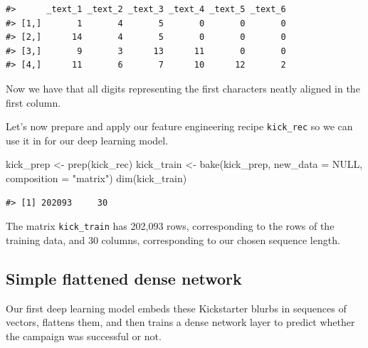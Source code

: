 \documentclass[
]{krantz}
\makeatletter
\newenvironment{Shaded}{\begin{snugshade}}{\end{snugshade}}
\newcommand{\AttributeTok}[1]{\textcolor[rgb]{0.77,0.63,0.00}{#1}}
\newcommand{\ConstantTok}[1]{\textcolor[rgb]{0.00,0.00,0.00}{#1}}
\newcommand{\FunctionTok}[1]{\textcolor[rgb]{0.00,0.00,0.00}{#1}}
\newcommand{\NormalTok}[1]{#1}
\newcommand{\OtherTok}[1]{\textcolor[rgb]{0.56,0.35,0.01}{#1}}
\newcommand{\StringTok}[1]{\textcolor[rgb]{0.31,0.60,0.02}{#1}}
\newenvironment{kframe}{%
\medskip{}
\setlength{\fboxsep}{.8em}
 \def\at@end@of@kframe{}%
 \ifinner\ifhmode%
  \def\at@end@of@kframe{\end{minipage}}%
  \begin{minipage}{\columnwidth}%
 \fi\fi%
 \def\FrameCommand##1{\hskip\@totalleftmargin \hskip-\fboxsep
 \colorbox{shadecolor}{##1}\hskip-\fboxsep
     \hskip-\linewidth \hskip-\@totalleftmargin \hskip\columnwidth}%
 \MakeFramed {\advance\hsize-\width
   \@totalleftmargin\z@ \linewidth\hsize
   \@setminipage}}%
 {\par\unskip\endMakeFramed%
 \at@end@of@kframe}
\renewenvironment{Shaded}{\begin{kframe}}{\end{kframe}}
\makeatother
\begin{document}
\begin{verbatim}
#>      _text_1 _text_2 _text_3 _text_4 _text_5 _text_6
#> [1,]       1       4       5       0       0       0
#> [2,]      14       4       5       0       0       0
#> [3,]       9       3      13      11       0       0
#> [4,]      11       6       7      10      12       2
\end{verbatim}

Now we have that all digits representing the first characters neatly aligned in the first column.

Let's now prepare and apply our feature engineering recipe \texttt{kick\_rec} so we can use it in for our deep learning model.

\begin{Shaded}
\begin{Highlighting}[]
\NormalTok{kick\_prep }\OtherTok{\textless{}{-}}  \FunctionTok{prep}\NormalTok{(kick\_rec)}
\NormalTok{kick\_train }\OtherTok{\textless{}{-}} \FunctionTok{bake}\NormalTok{(kick\_prep, }\AttributeTok{new\_data =} \ConstantTok{NULL}\NormalTok{, }\AttributeTok{composition =} \StringTok{"matrix"}\NormalTok{)}
\FunctionTok{dim}\NormalTok{(kick\_train)}
\end{Highlighting}
\end{Shaded}

\begin{verbatim}
#> [1] 202093     30
\end{verbatim}

The matrix \texttt{kick\_train} has 202,093 rows, corresponding to the rows of the training data, and 30 columns, corresponding to our chosen sequence length.

\hypertarget{simple-flattened-dense-network}{%
\subsection{Simple flattened dense network}\label{simple-flattened-dense-network}}

Our first deep learning model embeds these Kickstarter blurbs in sequences of vectors, flattens them, and then trains a dense network layer to predict whether the campaign was successful or not.
\end{document}
